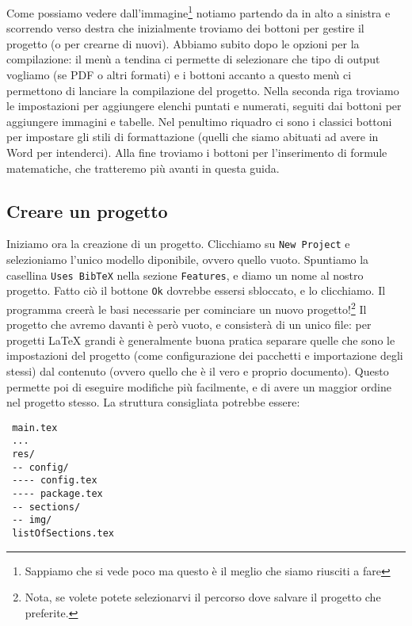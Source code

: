 Come possiamo vedere dall'immagine\footnote{Sappiamo che si vede poco
ma questo è il meglio che siamo riusciti a fare} notiamo partendo da in alto
a sinistra e scorrendo verso destra che inizialmente troviamo dei bottoni per
gestire il progetto (o per crearne di nuovi).
Abbiamo subito dopo le opzioni per la compilazione: il menù a tendina ci
permette di selezionare che tipo di output vogliamo (se PDF o altri formati) e
i bottoni accanto a questo menù ci permettono di lanciare la compilazione
del progetto.
Nella seconda riga troviamo le impostazioni per aggiungere elenchi puntati e
numerati, seguiti dai bottoni per aggiungere immagini e tabelle. Nel penultimo
riquadro ci sono i classici bottoni per impostare gli stili di formattazione
(quelli che siamo abituati ad avere in Word per intenderci).
Alla fine troviamo i bottoni per l'inserimento di formule matematiche, che
tratteremo più avanti in questa guida.

\subsection{Creare un progetto}

Iniziamo ora la creazione di un progetto.
Clicchiamo su \texttt{New Project} e selezioniamo l'unico modello diponibile,
ovvero quello vuoto. Spuntiamo la casellina \texttt{Uses BibTeX} nella sezione
\texttt{Features}, e diamo un nome al nostro progetto. Fatto ciò il bottone
\texttt{Ok} dovrebbe essersi sbloccato, e lo clicchiamo. Il programma creerà
le basi necessarie per cominciare un nuovo progetto!\footnote{Nota, se volete
potete selezionarvi il percorso dove salvare il progetto che preferite.}
Il progetto che avremo davanti è però vuoto, e consisterà di un unico file: per
progetti \LaTeX{} grandi è generalmente buona pratica separare quelle che sono
le impostazioni del progetto (come configurazione dei pacchetti e importazione
degli stessi) dal contenuto (ovvero quello che è il vero e proprio documento).
Questo permette poi di eseguire modifiche più facilmente, e di avere un maggior
ordine nel progetto stesso.
La struttura consigliata potrebbe essere:
\begin{verbatim}
 main.tex
 ...
 res/
 -- config/
 ---- config.tex
 ---- package.tex
 -- sections/
 -- img/
 listOfSections.tex
\end{verbatim}

